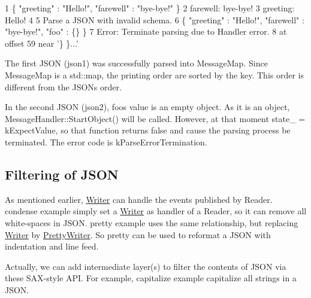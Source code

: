 \begin{DoxyCode}
1 \{ "greeting" : "Hello!", "farewell" : "bye-bye!" \}
2 farewell: bye-bye!
3 greeting: Hello!
4 
5 Parse a JSON with invalid schema.
6 \{ "greeting" : "Hello!", "farewell" : "bye-bye!", "foo" : \{\} \}
7 Error: Terminate parsing due to Handler error.
8  at offset 59 near '\} \}...'
\end{DoxyCode}


The first J\+S\+ON ({\ttfamily json1}) was successfully parsed into {\ttfamily Message\+Map}. Since {\ttfamily Message\+Map} is a {\ttfamily std\+::map}, the printing order are sorted by the key. This order is different from the J\+S\+ON\textquotesingle{}s order.

In the second J\+S\+ON ({\ttfamily json2}), {\ttfamily foo}\textquotesingle{}s value is an empty object. As it is an object, {\ttfamily Message\+Handler\+::\+Start\+Object()} will be called. However, at that moment {\ttfamily state\+\_\+ = k\+Expect\+Value}, so that function returns {\ttfamily false} and cause the parsing process be terminated. The error code is {\ttfamily k\+Parse\+Error\+Termination}.\hypertarget{md_Commun_Externe_RapidJSON_doc_sax.zh-cn_Filtering}{}\subsection{Filtering of J\+S\+ON}\label{md_Commun_Externe_RapidJSON_doc_sax.zh-cn_Filtering}
As mentioned earlier, {\ttfamily \hyperlink{class_writer}{Writer}} can handle the events published by {\ttfamily Reader}. {\ttfamily condense} example simply set a {\ttfamily \hyperlink{class_writer}{Writer}} as handler of a {\ttfamily Reader}, so it can remove all white-\/spaces in J\+S\+ON. {\ttfamily pretty} example uses the same relationship, but replacing {\ttfamily \hyperlink{class_writer}{Writer}} by {\ttfamily \hyperlink{class_pretty_writer}{Pretty\+Writer}}. So {\ttfamily pretty} can be used to reformat a J\+S\+ON with indentation and line feed.

Actually, we can add intermediate layer(s) to filter the contents of J\+S\+ON via these S\+A\+X-\/style A\+PI. For example, {\ttfamily capitalize} example capitalize all strings in a J\+S\+ON.


